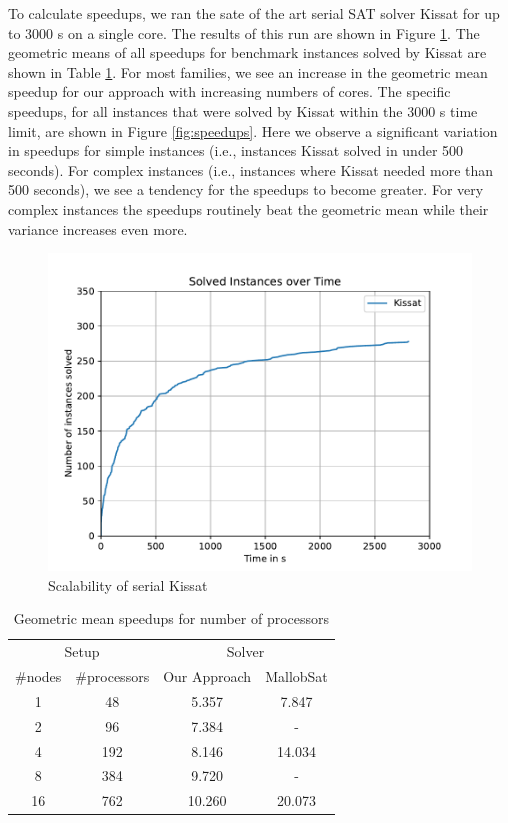 \documentclass[12pt,a4paper,twoside]{scrartcl}
\numberwithin{equation}{section}
\begin{document}
To calculate speedups, we ran the sate of the art serial SAT solver Kissat \cite{kissat} for up to 3000 s on a single core. The results of this run are shown in Figure \ref{fig:runtimeSerial}. The geometric means of all speedups for benchmark instances solved by Kissat are shown in Table \ref{tab:speedups}. For most families, we see an increase in the geometric mean speedup for our approach with increasing numbers of cores. The specific speedups, for all instances that were solved by Kissat within the 3000 s time limit, are shown in Figure \ref{fig:speedups}. Here we observe a significant variation in speedups for simple instances (i.e., instances Kissat solved in under 500 seconds). For complex instances (i.e., instances where Kissat needed more than 500 seconds), we see a tendency for the speedups to become greater. For very complex instances the speedups routinely beat the geometric mean while their variance increases even more.

\begin{figure}
  \center
  \includegraphics[scale=.5]{plots/cumulative_runtime/scalability_serial.pdf}
  \caption{Scalability of serial Kissat}
  \label{fig:runtimeSerial}
\end{figure}

\begin{table}
  \center
  \begin{tabular}{ cccc }
    \toprule
    \multicolumn{2}{c}{Setup} & \multicolumn{2}{c}{Solver}\\
    \#nodes   & \#processors   & Our Approach  & MallobSat \\
    \midrule
    1  & 48  & 5.357    & 7.847\\
    2  & 96  & 7.384    & -\\
    4  & 192 & 8.146    & 14.034\\
    8  & 384 & 9.720    & -\\
    16 & 762 & 10.260   & 20.073\\
    \bottomrule
  \end{tabular}
  \caption{Geometric mean speedups for number of processors}
  \label{tab:speedups}
\end{table}
\end{document}
